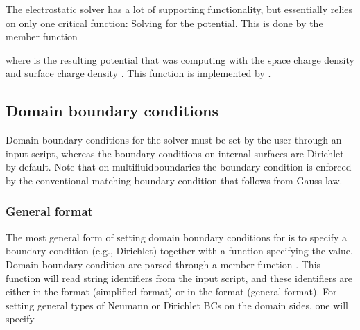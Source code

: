 \documentclass[letterpaper,10pt,english]{sphinxmanual}
\begin{document}
The electrostatic solver  has a lot of supporting functionality, but essentially relies on only one critical function:
Solving for the potential.
This is done by the member function

\begin{sphinxVerbatim}[commandchars=\\\{\},formatcom=\scriptsize]
        
\end{sphinxVerbatim}

where  is the resulting potential that was computing with the space charge density  and surface charge density .
This function is implemented by {\hyperref[\detokenize{Solvers/Electrostatics:chap-fieldsolvermultigrid}]{}}.


\subsection{Domain boundary conditions}
\label{\detokenize{Solvers/Electrostatics:domain-boundary-conditions}}\label{\detokenize{Solvers/Electrostatics:chap-poissondomainbc}}
Domain boundary conditions for the solver must be set by the user through an input script, whereas the boundary conditions on internal surfaces are Dirichlet by default.
Note that on multifluid\sphinxhyphen{}boundaries the boundary condition is enforced by the conventional matching boundary condition that follows from Gauss\textasciigrave{} law.


\subsubsection{General format}
\label{\detokenize{Solvers/Electrostatics:general-format}}
The most general form of setting domain boundary conditions for  is to specify a boundary condition  (e.g., Dirichlet) together with a function specifying the value.
Domain boundary condition  are parsed through a member function .
This function will read string identifiers from the input script, and these identifiers are either in the format  (simplified format) or in the format  (general format).
For setting general types of Neumann or Dirichlet BCs on the domain sides, one will specify
\end{document}
